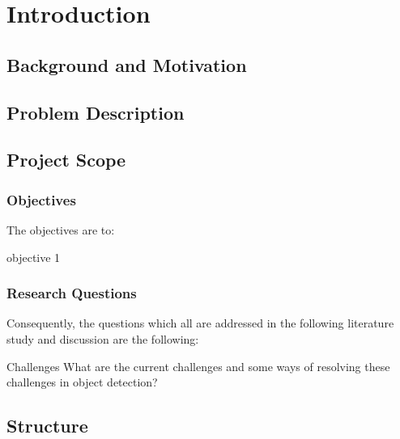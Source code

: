 \section{Introduction}


\subsection{Background and Motivation}

\subsection{Problem Description}

\subsection{Project Scope}

\subsubsection{Objectives}
\label{sec:primary_objectives}
The objectives are to:
\begin{primaryobjective}
    objective 1
\end{primaryobjective}

\subsubsection{Research Questions}
\label{sec:research_questions}
Consequently, the questions which all are addressed in the following literature study and discussion are the following:

\begin{researchQ}{Challenges}
    What are the current challenges and some ways of resolving these challenges in object detection?
\end{researchQ}


\subsection{Structure}